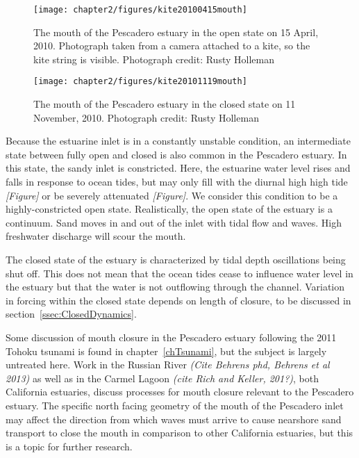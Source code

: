 \begin{figure}
	\begin{center}
		\texttt{[image: chapter2/figures/kite20100415mouth]} 
	\end{center}
\caption{The mouth of the Pescadero estuary in the open state on 15 April, 2010. Photograph taken from a camera attached to a kite, so the kite string is visible. Photograph credit: Rusty Holleman}\label{fig:kite_photos} \end{figure}

\begin{figure}
	\begin{center}
		\texttt{[image: chapter2/figures/kite20101119mouth]} 
	\end{center}
\caption{The mouth of the Pescadero estuary in the closed state on 11 November, 2010.  Photograph credit: Rusty Holleman}\label{fig:kite_photos} \end{figure}

Because the estuarine inlet is in a constantly unstable condition, an intermediate state between fully open and closed is also common in the Pescadero estuary.  In this state, the sandy inlet is constricted. Here, the estuarine water level rises and falls in response to ocean tides, but may only fill with the diurnal high high tide \emph{[Figure]} or be severely attenuated \emph{[Figure]}. We consider this condition to be a highly-constricted open state. Realistically, the open state of the estuary is a continuum. Sand moves in and out of the inlet with tidal flow and waves. High freshwater discharge will scour the mouth.

The closed state of the estuary is characterized by tidal depth oscillations being shut off. This does not mean that the ocean tides cease to influence water level in the estuary but that the water is not outflowing through the channel. Variation in forcing within the closed
state depends on length of closure, to be discussed in section~\ref{ssec:ClosedDynamics}.

Some discussion of mouth closure in the Pescadero estuary following the 2011 Tohoku tsunami is found in chapter~\ref{chTsunami}, but the subject is largely untreated here. Work in the Russian River \emph{(Cite Behrens phd, Behrens et al 2013)} as well as in the Carmel Lagoon \emph{(cite Rich and Keller, 201?)}, both California estuaries, discuss processes for mouth closure relevant to the Pescadero estuary. The specific north facing geometry of the mouth of the Pescadero inlet may affect the direction from which waves must arrive to cause nearshore sand transport to close the mouth in comparison to other California estuaries, but this is a topic for further research.

